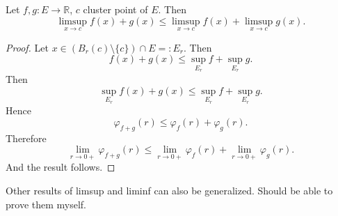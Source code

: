 \begin{proposition}
	Let $f,g : E \to \mathbb{R}$, $c$ cluster point of $E$. Then \[
		\limsup_{x \to c} f(x) + g(x) \le 
		\limsup_{x \to c} f(x) + \limsup_{x \to c} g(x)
	.\] 
\end{proposition}
\begin{proof}
	Let $x \in \left( B_r(c) \setminus \{c\}  \right) \cap E =: E_r$. Then
	\[
		f(x) + g(x) \le \operatorname{sup}_{E_r}f + \operatorname{sup}_{E_r} g
	.\] 
	Then
	\[
		\operatorname{sup}_{E_r} f(x) + g(x) \le \operatorname{sup}_{E_r}f + \operatorname{sup}_{E_r} g
	.\]
	Hence
	 \[
		\varphi_{f+g}(r) \le \varphi_f(r) + \varphi_g(r)
	.\] 
	Therefore
	\[
		\lim_{r \to 0+} \varphi_{f+g} (r) \le \lim_{r \to 0+} \varphi_f(r) + \lim_{r \to 0+} \varphi_g(r)
	.\] 
	And the result follows.
\end{proof}
\begin{remark}
	Other results of limsup and liminf can also be generalized. Should be able to prove them myself.
\end{remark}

